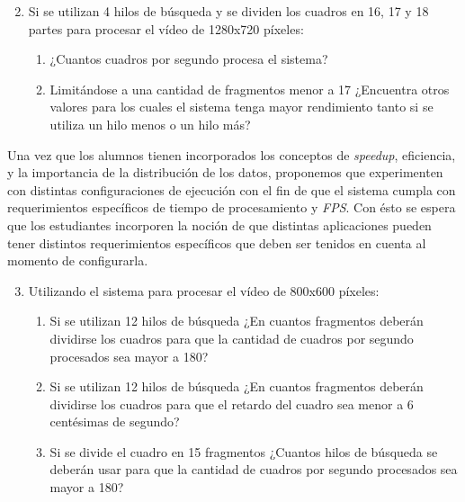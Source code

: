 \begin{enumerate}
	
	\setcounter{enumi}{1}

	\item{Si se utilizan 4 hilos de búsqueda y se dividen los cuadros en 16,
		17 y 18 partes para procesar el vídeo de 1280x720 píxeles:

\begin{enumerate}

	\item{¿Cuantos cuadros por segundo procesa el sistema?}

	\item{Limitándose a una cantidad de fragmentos menor a 17 ¿Encuentra
		otros valores para los cuales el sistema tenga mayor rendimiento
		tanto si se utiliza un hilo menos o un hilo más?}

\end{enumerate}}


\end{enumerate}

Una vez que los alumnos tienen incorporados los conceptos de \emph{speedup},
eficiencia, y la importancia de la distribución de los datos, proponemos que
experimenten con distintas configuraciones de ejecución con el fin de que el
sistema cumpla con requerimientos específicos de tiempo de procesamiento y
\emph{FPS}. Con ésto se espera que los estudiantes incorporen la noción de que
distintas aplicaciones pueden tener distintos requerimientos específicos que
deben ser tenidos en cuenta al momento de configurarla.

\begin{enumerate}

	\setcounter{enumi}{2}

	\item{Utilizando el sistema para procesar el vídeo de 800x600 píxeles:

\begin{enumerate}

	\item{Si se utilizan 12 hilos de búsqueda ¿En cuantos fragmentos deberán
		dividirse los cuadros para que la cantidad de cuadros por
		segundo procesados sea mayor a 180?}

	\item{Si se utilizan 12 hilos de búsqueda ¿En cuantos fragmentos deberán
		dividirse los cuadros para que el retardo del cuadro sea menor a
		6 centésimas de segundo?}

	\item{Si se divide el cuadro en 15 fragmentos ¿Cuantos hilos de búsqueda
		se deberán usar para que la cantidad de cuadros por segundo
		procesados sea mayor a 180?}

\end{enumerate}}

\end{enumerate}

